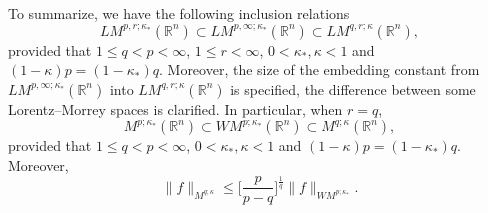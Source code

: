 \documentclass{birkjour}
\theoremstyle{definition}
\theoremstyle{remark}
\numberwithin{equation}{section}
\begin{document}
To summarize, we have the following inclusion relations
\begin{equation*}
LM^{p,r;\kappa_{*}}(\mathbb R^n)\subset LM^{p,\infty;\kappa_{*}}(\mathbb R^n)\subset LM^{q,r;\kappa}(\mathbb R^n),
\end{equation*}
provided that $1\leq q<p<\infty$, $1\leq r<\infty$, $0<\kappa_{*},\kappa<1$ and $(1-\kappa)p=(1-\kappa_*)q$. Moreover, the size of the embedding constant from $LM^{p,\infty;\kappa_{*}}(\mathbb R^n)$ into $LM^{q,r;\kappa}(\mathbb R^n)$ is specified, the difference between some Lorentz--Morrey spaces is clarified. In particular, when $r=q$,
\begin{equation*}
M^{p;\kappa_{*}}(\mathbb R^n)\subset WM^{p;\kappa_{*}}(\mathbb R^n)\subset M^{q;\kappa}(\mathbb R^n),
\end{equation*}
provided that $1\leq q<p<\infty$, $0<\kappa_{*},\kappa<1$ and $(1-\kappa)p=(1-\kappa_*)q$. Moreover,
\begin{equation*}
\|f\|_{M^{q;\kappa}}\leq \Big[\frac{p}{p-q}\Big]^{\frac{1}{q}}\|f\|_{WM^{p;\kappa_{*}}}.
\end{equation*}
\end{document}
